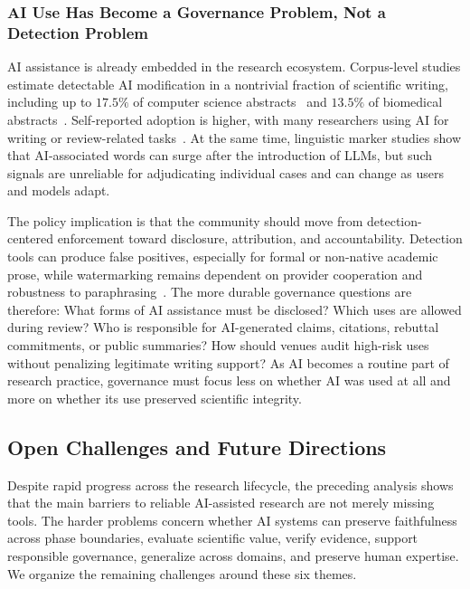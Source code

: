 \subsubsection{AI Use Has Become a Governance Problem, Not a Detection Problem}
\label{sec:insight_governance}

AI assistance is already embedded in the research ecosystem. Corpus-level studies estimate detectable AI modification in a nontrivial fraction of scientific writing, including up to $17.5\%$ of computer science abstracts~\cite{liang2024mapping} and $13.5\%$ of biomedical abstracts~\cite{kobak2024delve}. Self-reported adoption is higher, with many researchers using AI for writing or review-related tasks~\cite{aireviewsurvey2025}. At the same time, linguistic marker studies show that AI-associated words can surge after the introduction of LLMs, but such signals are unreliable for adjudicating individual cases and can change as users and models adapt.

The policy implication is that the community should move from detection-centered enforcement toward disclosure, attribution, and accountability. Detection tools can produce false positives, especially for formal or non-native academic prose, while watermarking remains dependent on provider cooperation and robustness to paraphrasing~\cite{watermarking2025}. The more durable governance questions are therefore: What forms of AI assistance must be disclosed? Which uses are allowed during review? Who is responsible for AI-generated claims, citations, rebuttal commitments, or public summaries? How should venues audit high-risk uses without penalizing legitimate writing support? As AI becomes a routine part of research practice, governance must focus less on whether AI was used at all and more on whether its use preserved scientific integrity.



\subsection{Open Challenges and Future Directions}
\label{sec:open_challenges}

Despite rapid progress across the research lifecycle, the preceding analysis shows that the main barriers to reliable AI-assisted research are not merely missing tools. The harder problems concern whether AI systems can preserve faithfulness across phase boundaries, evaluate scientific value, verify evidence, support responsible governance, generalize across domains, and preserve human expertise. We organize the remaining challenges around these six themes.


